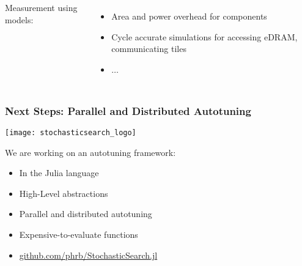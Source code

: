 \documentclass[10pt, compress, aspectratio=169]{beamer}
\begin{document}
\begin{frame}
\begin{columns}[T,onlytextwidth]
        \alert{Measurement using models}:
        \begin{itemize}
            \item Area and power overhead for components
            \item Cycle accurate simulations for accessing eDRAM, communicating tiles
            \item $\dots$
        \end{itemize}
    \end{columns}

    \vfill
\end{frame}

\begin{frame}
    \frametitle{Next Steps: Parallel and Distributed Autotuning}
    \begin{center}
        \texttt{[image: stochasticsearch\_logo]}
    \end{center}

    We are working on an autotuning framework:
    \begin{itemize}
        \item In the \alert{Julia} language
        \item High-Level abstractions
        \item \alert{Parallel and distributed autotuning}
        \item \alert{Expensive-to-evaluate functions}
        \item \url{github.com/phrb/StochasticSearch.jl}
    \end{itemize}
\end{frame}

\end{document}
